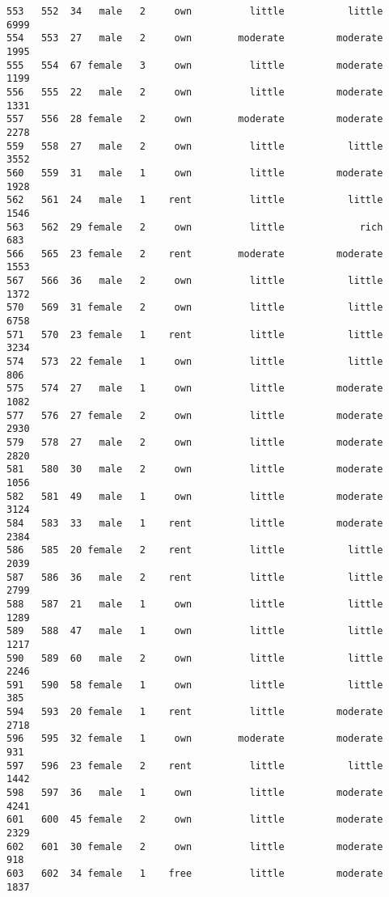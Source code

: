 \documentclass[
]{article}
\begin{document}
\begin{verbatim}
553   552  34   male   2     own          little           little          6999
554   553  27   male   2     own        moderate         moderate          1995
555   554  67 female   3     own          little         moderate          1199
556   555  22   male   2     own          little         moderate          1331
557   556  28 female   2     own        moderate         moderate          2278
559   558  27   male   2     own          little           little          3552
560   559  31   male   1     own          little         moderate          1928
562   561  24   male   1    rent          little           little          1546
563   562  29 female   2     own          little             rich           683
566   565  23 female   2    rent        moderate         moderate          1553
567   566  36   male   2     own          little           little          1372
570   569  31 female   2     own          little           little          6758
571   570  23 female   1    rent          little           little          3234
574   573  22 female   1     own          little           little           806
575   574  27   male   1     own          little         moderate          1082
577   576  27 female   2     own          little         moderate          2930
579   578  27   male   2     own          little         moderate          2820
581   580  30   male   2     own          little         moderate          1056
582   581  49   male   1     own          little         moderate          3124
584   583  33   male   1    rent          little         moderate          2384
586   585  20 female   2    rent          little           little          2039
587   586  36   male   2    rent          little           little          2799
588   587  21   male   1     own          little           little          1289
589   588  47   male   1     own          little           little          1217
590   589  60   male   2     own          little           little          2246
591   590  58 female   1     own          little           little           385
594   593  20 female   1    rent          little         moderate          2718
596   595  32 female   1     own        moderate         moderate           931
597   596  23 female   2    rent          little           little          1442
598   597  36   male   1     own          little         moderate          4241
601   600  45 female   2     own          little         moderate          2329
602   601  30 female   2     own          little         moderate           918
603   602  34 female   1    free          little         moderate          1837

\end{verbatim}
\end{document}
